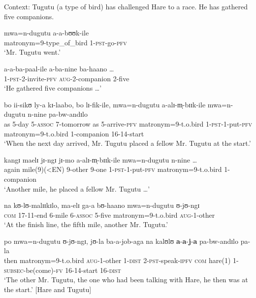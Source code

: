 \begin{exe}
\ex \label{exSubsecutiveHareTugutu}
Context: Tugutu (a type of bird) has challenged Hare to a race. He has gathered five companions.
\begin{xlist}

\ex \gll mwa=n-dugutu a-a-bʊʊk-ile\\
matronym=9-type\_of\_bird 1-\textsc{pst}-go-\textsc{pfv}\\
\glt \lq Mr. Tugutu went.'

\ex \gll a-a-ba-paal-ile a-ba-nine ba-haano \ldots\\
1-\textsc{pst}-2-invite-\textsc{pfv} \textsc{aug}-2-companion 2-five {}\\
\glt \lq He gathered five companions \ldots'


\ex \label{exSubsecutiveHareTugutuSentence3} \gll bo ii-sikʊ ly-a kɪ-laabo, bo lɪ-fik-ile, mwa=n-dugutu a-alɪ-m̩-bɪɪk-ile mwa=n-dugutu n-nine pa-bw-andɪlo\\
as 5-day 5-\textsc{assoc} 7-tomorrow as 5-arrive-\textsc{pfv} matronym=9-t.o.bird 1-\textsc{pst}-1-put-\textsc{pfv} matronym=9-t.o.bird 1-companion 16-14-start\\
\glt \lq When the next day arrived, Mr. Tugutu placed a fellow Mr. Tugutu at the start.'

\ex \label{exSubsecutiveHareTugutuSentence4} \gll kangɪ maelɪ jɪ-ngɪ jɪ-mo a-alɪ-m̩-bɪɪk-ile mwa=n-dugutu n-nine \ldots\\
again mile(9)(<EN) 9-other 9-one 1-\textsc{pst}-1-put-\textsc{pfv} matronym=9-t.o.bird 1-companion {}\\
\glt \lq Another mile, he placed a fellow Mr. Tugutu \ldots'

\ex \label{exSubsecutiveHareTugutuSentence5} \gll na kʊ-lʊ-malɪɪkɪlo, ma-elɪ ga-a bʊ-haano mwa=n-dugutu ʊ-jʊ-ngɪ\\
\textsc{com} 17-11-end 6-mile 6-\textsc{assoc} 5-five matronym=9-t.o.bird \textsc{aug}-1-other\\
\glt \lq At the finish line, the fifth mile, another Mr. Tugutu.'

\ex \label{exSubsecutiveHareTugutuSentence6} \gll po mwa=n-dugutu ʊ-jʊ-ngɪ, jʊ-la ba-a-job-aga na kalʊlʊ \textbf{a}-\textbf{a}-\textbf{j}-\textbf{a} pa-bw-andɪlo pa-la\\
then matronym=9-t.o.bird \textsc{aug}-1-other 1-\textsc{dist} 2-\textsc{pst}-speak-\textsc{ipfv} \textsc{com} hare(1) 1-\textsc{subsec}-be(come)-\textsc{fv} 16-14-start 16-\textsc{dist}\\
\glt \lq  ‎‎The other Mr. Tugutu, the one who had been talking with Hare, he then was at the start.' [Hare and Tugutu]
\end{xlist}
\end{exe}%

